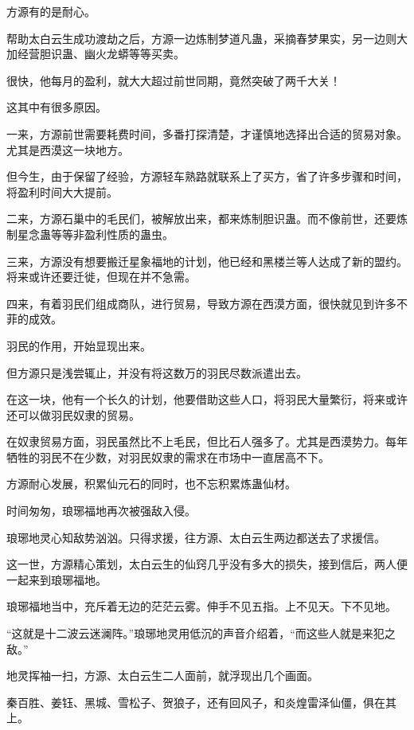 
\begin{this_body}



方源有的是耐心。

帮助太白云生成功渡劫之后，方源一边炼制梦道凡蛊，采摘春梦果实，另一边则大加经营胆识蛊、幽火龙蟒等等买卖。

很快，他每月的盈利，就大大超过前世同期，竟然突破了两千大关！

这其中有很多原因。

一来，方源前世需要耗费时间，多番打探清楚，才谨慎地选择出合适的贸易对象。尤其是西漠这一块地方。

但今生，由于保留了经验，方源轻车熟路就联系上了买方，省了许多步骤和时间，将盈利时间大大提前。

二来，方源石巢中的毛民们，被解放出来，都来炼制胆识蛊。而不像前世，还要炼制星念蛊等等非盈利性质的蛊虫。

三来，方源没有想要搬迁星象福地的计划，他已经和黑楼兰等人达成了新的盟约。将来或许还要迁徙，但现在并不急需。

四来，有着羽民们组成商队，进行贸易，导致方源在西漠方面，很快就见到许多不菲的成效。

羽民的作用，开始显现出来。

但方源只是浅尝辄止，并没有将这数万的羽民尽数派遣出去。

在这一块，他有一个长久的计划，他要借助这些人口，将羽民大量繁衍，将来或许还可以做羽民奴隶的贸易。

在奴隶贸易方面，羽民虽然比不上毛民，但比石人强多了。尤其是西漠势力。每年牺牲的羽民不在少数，对羽民奴隶的需求在市场中一直居高不下。

方源耐心发展，积累仙元石的同时，也不忘积累炼蛊仙材。

时间匆匆，琅琊福地再次被强敌入侵。

琅琊地灵心知敌势汹汹。只得求援，往方源、太白云生两边都送去了求援信。

这一世，方源精心策划，太白云生的仙窍几乎没有多大的损失，接到信后，两人便一起来到琅琊福地。

琅琊福地当中，充斥着无边的茫茫云雾。伸手不见五指。上不见天。下不见地。

“这就是十二波云迷澜阵。”琅琊地灵用低沉的声音介绍着，“而这些人就是来犯之敌。”

地灵挥袖一扫，方源、太白云生二人面前，就浮现出几个画面。

秦百胜、姜钰、黑城、雪松子、贺狼子，还有回风子，和炎煌雷泽仙僵，俱在其上。


\end{this_body}
